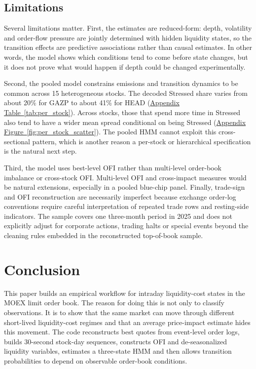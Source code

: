 \documentclass[12pt,a4paper]{article}
\newcommand{\apptabref}[1]{\hyperref[#1]{Appendix Table~\ref*{#1}}}
\newcommand{\appfigref}[1]{\hyperref[#1]{Appendix Figure~\ref*{#1}}}
\begin{document}
\subsection{Limitations}\label{sec:limitations}

Several limitations matter. First, the estimates are reduced-form: depth, volatility  and order-flow pressure are jointly determined with hidden liquidity states, so the transition effects are predictive associations rather than causal estimates. In other words, the model shows which conditions tend to come before state changes, but it does not prove what would happen if depth could be changed experimentally.

Second, the pooled model constrains emissions and transition dynamics to be common across 15 heterogeneous stocks. The decoded Stressed share varies from about 20\% for GAZP to about 41\% for HEAD (\apptabref{tab:per_stock}). Across stocks, those that spend more time in Stressed also tend to have a wider mean spread conditional on being Stressed (\appfigref{fig:per_stock_scatter}). The pooled HMM cannot exploit this cross-sectional pattern, which is another reason a per-stock or hierarchical specification is the natural next step.

Third, the model uses best-level OFI rather than multi-level order-book imbalance or cross-stock OFI. Multi-level OFI \citep{XuGouldHowison2019} and cross-impact measures \citep{ContCucuringuZhang2023} would be natural extensions, especially in a pooled blue-chip panel. Finally, trade-sign and OFI reconstruction are necessarily imperfect because exchange order-log conventions require careful interpretation of repeated trade rows and resting-side indicators. The sample covers one three-month period in 2025 and does not explicitly adjust for corporate actions, trading halts or special events beyond the cleaning rules embedded in the reconstructed top-of-book sample.

\section{Conclusion}\label{sec:conclusion}

This paper builds an empirical workflow for intraday liquidity-cost states in the MOEX limit order book. The reason for doing this is not only to classify observations. It is to show that the same market can move through different short-lived liquidity-cost regimes and that an average price-impact estimate hides this movement. The code reconstructs best quotes from event-level order logs, builds 30-second stock-day sequences, constructs OFI and de-seasonalized liquidity variables, estimates a three-state HMM  and then allows transition probabilities to depend on observable order-book conditions.
\end{document}
